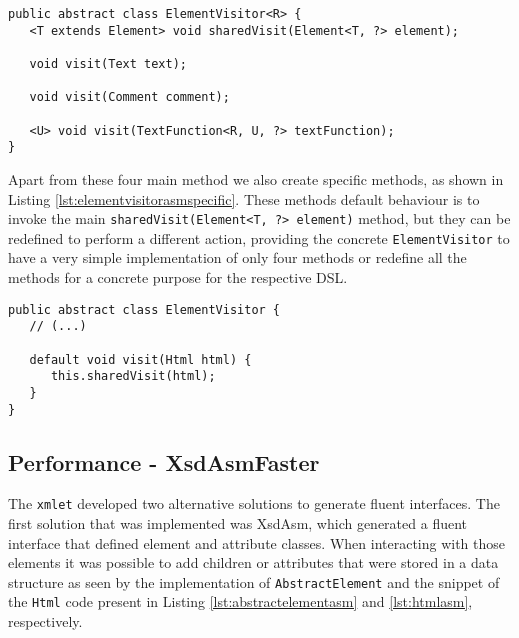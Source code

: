 \bigskip


\begin{minipage}{\linewidth}
\begin{lstlisting}[caption={ElementVisitor generated by XsdAsm - 1},label={lst:elementvisitorasm}]
public abstract class ElementVisitor<R> {
   <T extends Element> void sharedVisit(Element<T, ?> element);

   void visit(Text text);

   void visit(Comment comment);

   <U> void visit(TextFunction<R, U, ?> textFunction);
}
\end{lstlisting}
\end{minipage}

\noindent
Apart from these four main method we also create specific methods, as shown in Listing \ref{lst:elementvisitorasmspecific}. These methods default behaviour is to invoke the main \texttt{sharedVisit(Element<T, ?> element)} method, but they can be redefined to perform a different action, providing the concrete \texttt{ElementVisitor} to have a very simple implementation of only four methods or redefine all the methods for a concrete purpose for the respective \ac{DSL}.

\bigskip


\begin{minipage}{\linewidth}
\begin{lstlisting}[caption={ElementVisitor generated by XsdAsm - 2},label={lst:elementvisitorasmspecific}]
public abstract class ElementVisitor {
   // (...)

   default void visit(Html html) {
      this.sharedVisit(html);
   }
}
\end{lstlisting}
\end{minipage}

\subsection{Performance - XsdAsmFaster}
\label{sec:xsdasmfaster}

The \texttt{xmlet} developed two alternative solutions to generate fluent interfaces. The first solution that was implemented was XsdAsm, which generated a fluent interface that defined element and attribute classes. When interacting with those elements it was possible to add children or attributes that were stored in a data structure as seen by the implementation of \texttt{AbstractElement} and the snippet of the \texttt{Html} code present in Listing \ref{lst:abstractelementasm} and \ref{lst:htmlasm}, respectively.

